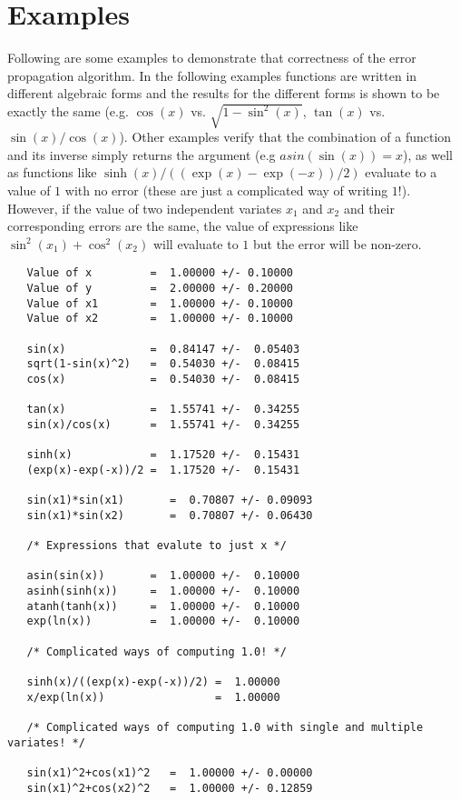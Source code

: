 \documentclass[11pt]{article}
\begin{document}
\section{Examples}
\label{SEC:EXAMPLES}
Following are some examples to demonstrate that correctness of the error propagation
algorithm.  In the following examples functions are written in different algebraic forms
and the results for the different forms is shown to be exactly the same (e.g. $\cos(x)$
vs.  $\sqrt{1-\sin^2(x)}$, $\tan(x)$ vs. $\sin(x)/\cos(x)$).  Other examples verify that
the combination of a function and its inverse simply returns the argument (e.g
$asin(\sin(x))=x$), as well as functions like $\sinh(x)/((\exp(x)-\exp(-x))/2)$ evaluate
to a value of $1$ with no error (these are just a complicated way of writing $1$!).
However, if the value of two independent variates $x_1$ and $x_2$ and their
corresponding errors are the same, the value of expressions like $\sin^2(x_1) +
\cos^2(x_2)$ will evaluate to $1$ but the error will be non-zero.
\begin{verbatim}
   Value of x         =  1.00000 +/- 0.10000
   Value of y         =  2.00000 +/- 0.20000
   Value of x1        =  1.00000 +/- 0.10000
   Value of x2        =  1.00000 +/- 0.10000

   sin(x)             =  0.84147 +/-  0.05403
   sqrt(1-sin(x)^2)   =  0.54030 +/-  0.08415
   cos(x)             =  0.54030 +/-  0.08415

   tan(x)             =  1.55741 +/-  0.34255
   sin(x)/cos(x)      =  1.55741 +/-  0.34255

   sinh(x)            =  1.17520 +/-  0.15431
   (exp(x)-exp(-x))/2 =  1.17520 +/-  0.15431

   sin(x1)*sin(x1)       =  0.70807 +/- 0.09093
   sin(x1)*sin(x2)       =  0.70807 +/- 0.06430

   /* Expressions that evalute to just x */

   asin(sin(x))       =  1.00000 +/-  0.10000
   asinh(sinh(x))     =  1.00000 +/-  0.10000
   atanh(tanh(x))     =  1.00000 +/-  0.10000
   exp(ln(x))         =  1.00000 +/-  0.10000

   /* Complicated ways of computing 1.0! */

   sinh(x)/((exp(x)-exp(-x))/2) =  1.00000 
   x/exp(ln(x))                 =  1.00000

   /* Complicated ways of computing 1.0 with single and multiple variates! */

   sin(x1)^2+cos(x1)^2   =  1.00000 +/- 0.00000
   sin(x1)^2+cos(x2)^2   =  1.00000 +/- 0.12859
\end{verbatim}
\end{document}
